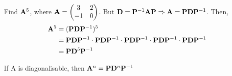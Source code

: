   \begin{problem}
    Find $\mathbf{A}^{5}$, where $\mathbf{A} = \begin{pmatrix} 3&2\\-1&0 \end{pmatrix}$.
    But $\mathbf{D}  = \mathbf{P} ^{-1} \mathbf{AP} \Rightarrow \mathbf{A} = \mathbf{PD} \mathbf{P}
    ^{-1}$. Then, 
\begin{align*}
  \mathbf{A}^{5} &= (\mathbf{PD} \mathbf{P} ^{-1})^5\\
              &= \mathbf{PD} \mathbf{P} ^{-1} \cdot \mathbf{PD} \mathbf{P} ^{-1} \cdot
              \mathbf{PD} \mathbf{P} ^{-1} \cdot \mathbf{PD} \mathbf{P} ^{-1} \cdot
              \mathbf{PD} \mathbf{P} ^{-1}\\
              &=\mathbf{P} \mathbf{D}^5 \mathbf{P} ^{-1}
\end{align*}
  \end{problem}

  \begin{note}
    If \matri A is diagonalisable, then $\mathbf{A}^n = \mathbf{P} \mathbf{D}^n \mathbf{P}
    ^{-1}$
  \end{note}
